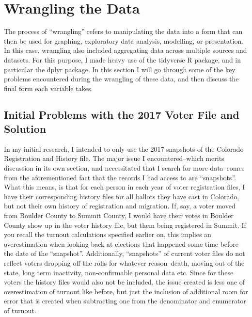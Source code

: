 \documentclass[12pt,twoside]{reedthesis}
\begin{document}
  \section{Wrangling the Data}\label{wrangling-the-data}
  
  The process of ``wrangling'' refers to manipulating the data into a form
  that can then be used for graphing, exploratory data analysis,
  modelling, or presentation. In this case, wrangling also included
  aggregating data across multiple sources and datasets. For this purpose,
  I made heavy use of the tidyverse R package, and in particular the dplyr
  package. In this section I will go through some of the key problems
  encountered during the wrangling of these data, and then discuss the
  final form each variable takes.
  
  \subsection{Initial Problems with the 2017 Voter File and
  Solution}\label{initial-problems-with-the-2017-voter-file-and-solution}
  
  In my initial research, I intended to only use the 2017 snapshots of the
  Colorado Registration and History file. The major issue I
  encountered--which merits discussion in its own section, and
  necessitated that I search for more data--comes from the aforementioned
  fact that the records I had access to are ``snapshots''. What this
  means, is that for each person in each year of voter registration files,
  I have their corresponding history files for all ballots they have cast
  in Colorado, but not their own history of registration and migration.
  If, say, a voter moved from Boulder County to Summit County, I would
  have their votes in Boulder County show up in the voter history file,
  but them being registered in Summit. If you recall the turnout
  calculations specified earlier on, this implies an overestimation when
  looking back at elections that happened some time before the date of the
  ``snapshot''. Additionally, ``snapshots'' of current voter files do not
  reflect voters dropping off the rolls for whatever reason--death, moving
  out of the state, long term inactivity, non-confirmable personal data
  etc. Since for these voters the history files would also not be
  included, the issue created is less one of overestimation of turnout
  like before, but just the inclusion of additional room for error that is
  created when subtracting one from the denominator and enumerator of
  turnout.
  
\end{document}

